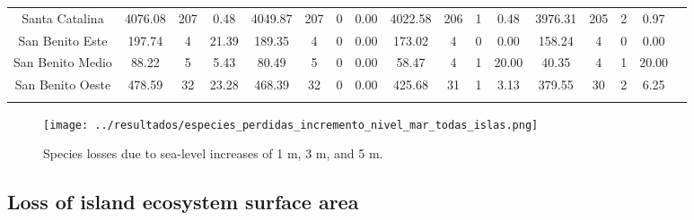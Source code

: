 \documentclass{article} %
\begin{document}
\begin{table}
\begin{adjustwidth}{-2.6cm}{}
\begin{footnotesize}
\begin{tabular}{ccccccccccccccccc}
Santa Catalina &   4076.08 &  207 &   0.48 &   4049.87 &  207 &    0 &   0.00 &   4022.58 &  206 &    1 &   0.48 &   3976.31 &  205 &      2 &    0.97 \\
San Benito Este &    197.74 &    4 &  21.39 &    189.35 &    4 &    0 &   0.00 &    173.02 &    4 &    0 &   0.00 &    158.24 &    4 &      0 &    0.00 \\
San Benito Medio &     88.22 &    5 &   5.43 &     80.49 &    5 &    0 &   0.00 &     58.47 &    4 &    1 &  20.00 &     40.35 &    4 &      1 &   20.00 \\
San Benito Oeste &    478.59 &   32 &  23.28 &    468.39 &   32 &    0 &   0.00 &    425.68 &   31 &    1 &   3.13 &    379.55 &   30 &      2 &    6.25 \\
\hline 
\label{Tab:tab4} 
\end{tabular} 
\end{footnotesize}
\end{adjustwidth}
\end{table}


\begin{figure}
  \begin{center}
  \texttt{[image: ../resultados/especies\_perdidas\_incremento\_nivel\_mar\_todas\_islas.png]}
  \caption{Species losses due to sea-level increases of 1 m, 3 m, and 5 m.}
  \label{fig:species_losses}
  \end{center}
\end{figure}

\subsection{Loss of island ecosystem surface area}
\end{document}
